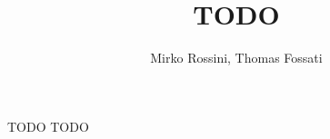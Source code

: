 \documentclass{beamer}
\author{Mirko Rossini, Thomas Fossati}
\title{TODO}
\institute{UniBo, KoanLogic}
\begin{document}
\begin{frame}[plain]
  \titlepage
\end{frame}

\begin{frame}{TODO}
TODO
\end{frame}
\end{document}
